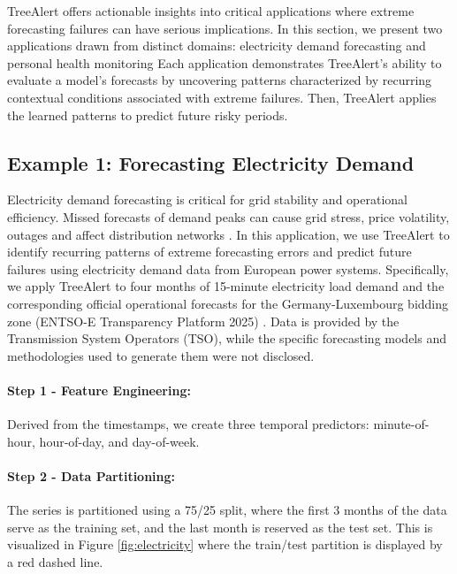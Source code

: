 \documentclass[12pt]{article}
\begin{document}
TreeAlert offers actionable insights into critical applications where extreme forecasting 
failures can have serious implications. In this section, we present two applications drawn 
from distinct domains: electricity demand forecasting and personal health monitoring%
Each application demonstrates TreeAlert's ability  to evaluate a model's forecasts by uncovering patterns characterized by recurring contextual conditions associated with extreme failures. Then, TreeAlert applies the learned patterns to predict future risky periods.

\subsection{Example 1: Forecasting Electricity Demand}
\FloatBarrier

Electricity demand forecasting is critical for grid stability and operational efficiency. Missed forecasts of demand peaks can cause grid stress, price volatility, outages and affect distribution networks \citep{ciarreta2023, gilbert2023, steinbuks2019}. In this application, we use TreeAlert to identify recurring patterns of extreme forecasting errors and predict future failures using electricity demand data from European power systems. Specifically, we apply TreeAlert to four months of 15-minute electricity load demand and the corresponding official operational forecasts for the Germany-Luxembourg bidding zone (ENTSO-E Transparency Platform 2025) \citep{entsoe2025}. Data is provided by the Transmission System Operators (TSO), while the specific forecasting models and methodologies used to generate them were not disclosed. %

\paragraph{Step 1 - Feature Engineering:}
Derived from the timestamps, we create three temporal predictors: minute-of-hour, hour-of-day, and day-of-week.

\paragraph{Step 2 - Data Partitioning:} The series is partitioned using a 75/25 split, where the first 3 months of the data serve as the training set, and the last month is reserved as the test set. This is visualized in Figure \ref{fig:electricity} where the train/test partition is displayed by a red dashed line.
\end{document}
